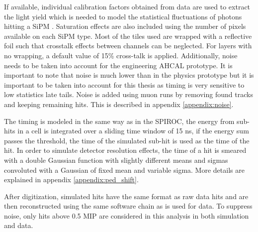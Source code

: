 If available, individual calibration factors obtained from data are used to extract the light yield which is needed to model the statistical fluctuations of photons hitting a SiPM \cite{Hartbrich:2016bbz}. Saturation effects are also included using the number of pixels available on each SiPM type. Most of the tiles used are wrapped with a reflective foil such that crosstalk effects between channels can be neglected. For layers with no wrapping, a default value of 15\% cross-talk is applied. Additionally, noise needs to be taken into account for the engineering AHCAL prototype. It is important to note that noise is much lower than in the physics prototype but it is important to be taken into account for this thesis as timing is very sensitive to low statistics late tails. Noise is added using muon runs by removing found tracks and keeping remaining hits. This is described in appendix \ref{appendix:noise}.

The timing is modeled in the same way as in the SPIROC, the energy from sub-hits in a cell is integrated over a sliding time window of 15 ns, if the energy sum passes the threshold, the time of the simulated sub-hit is used as the time of the hit. In order to simulate detector resolution effects, the time of a hit is smeared with a double Gaussian function with slightly different means and sigmas convoluted with a Gaussian of fixed mean and variable sigma. More details are explained in appendix \ref{appendix:ped_shift}.

After digitization, simulated hits have the same format as raw data hits and are then reconstructed using the same software chain as is used for data. To suppress noise, only hits above 0.5 MIP are considered in this analysis in both simulation and data.
